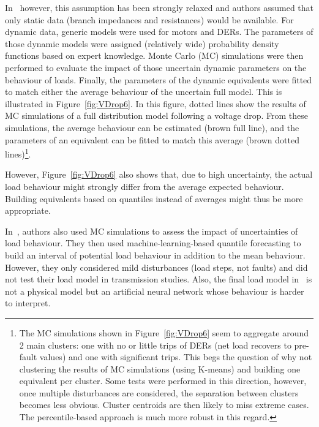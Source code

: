 In~\cite{ChaspierrePaper, ChaspierreThesis} however, this assumption has been strongly relaxed and authors assumed that only static data (\ie branch impedances and resistances) would be available. For dynamic data, generic models were used for motors and DERs. The parameters of those dynamic models were assigned (relatively wide) probability density functions based on expert knowledge. Monte Carlo (MC) simulations were then performed to evaluate the impact of those uncertain dynamic parameters on the behaviour of loads. Finally, the parameters of the dynamic equivalents were fitted to match either the average behaviour of the uncertain full model. This is illustrated in Figure~\ref{fig:VDrop6}. In this figure, dotted lines show the results of MC simulations of a full distribution model following a voltage drop. From these simulations, the average behaviour can be estimated (brown full line), and the parameters of an equivalent can be fitted to match this average (brown dotted lines)\footnote{The MC simulations shown in Figure~\ref{fig:VDrop6} seem to aggregate around 2 main clusters: one with no or little trips of DERs (net load recovers to pre-fault values) and one with significant trips. This begs the question of why not clustering the results of MC simulations (\eg using K-means) and building one equivalent per cluster. Some tests were performed in this direction, however, once multiple disturbances are considered, the separation between clusters becomes less obvious. Cluster centroids are then likely to miss extreme cases. The percentile-based approach is much more robust in this regard.}.

However, Figure~\ref{fig:VDrop6} also shows that, due to high uncertainty, the actual load behaviour might strongly differ from the average expected behaviour. Building equivalents based on quantiles instead of averages might thus be more appropriate.

In~\cite{Vorwerk}, authors also used MC simulations to assess the impact of uncertainties of load behaviour. They then used machine-learning-based quantile forecasting to build an interval of potential load behaviour in addition to the mean behaviour. However, they only considered mild disturbances (load steps, not faults) and did not test their load model in transmission studies. Also, the final load model in~\cite{Vorwerk} is not a physical model but an artificial neural network whose behaviour is harder to interpret.

